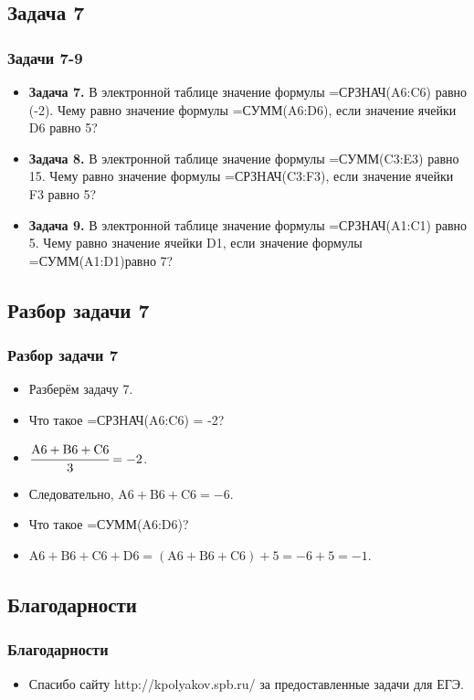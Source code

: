 \documentclass[compress,red]{beamer}
\begin{document}
\subsection{Задача 7}
\begin{frame}[fragile]
  \frametitle{Задачи 7-9}
  \begin{itemize}[<+->]
    \item \textbf{Задача 7.} В электронной таблице значение формулы =СРЗНАЧ(A6:C6) равно (-2). Чему равно значение формулы =СУММ(A6:D6), если значение ячейки D6 равно 5? 
    \item \textbf{Задача 8.} В электронной таблице значение формулы =СУММ(C3:E3) равно 15. Чему равно значение формулы =СРЗНАЧ(C3:F3), если значение ячейки F3 равно 5?
    \item \textbf{Задача 9.} В электронной таблице значение формулы =СРЗНАЧ(A1:C1) равно 5. Чему равно значение ячейки D1, если значение формулы =СУММ(A1:D1)равно 7?
  \end{itemize}
\end{frame}

\subsection{Разбор задачи 7}
\begin{frame}[fragile]
  \frametitle{Разбор задачи 7}
  \begin{itemize}[<+->]
    \item Разберём задачу 7.
    \item Что такое =СРЗНАЧ(A6:C6) = -2?
    \item $\cfrac{\mathrm{A6+B6+C6}}{3} = -2$.
    \item Следовательно, $\mathrm{A6+B6+C6} = -6$.
    \item Что такое =СУММ(A6:D6)?
    \item $\mathrm{A6+B6+C6+D6 = (A6+B6+C6) + 5 = -6 + 5 = -1}$.
  \end{itemize}
\end{frame}

\subsection{Благодарности}
\begin{frame}[fragile]
  \frametitle{Благодарности}
  \begin{itemize}
    \item Спасибо сайту http://kpolyakov.spb.ru/ за предоставленные задачи для ЕГЭ.
  \end{itemize}
\end{frame}
\end{document}
